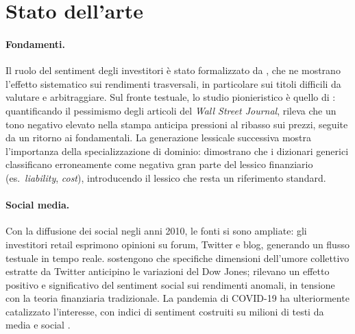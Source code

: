 \documentclass[a4paper,11pt]{article}
\begin{document}
\section{Stato dell'arte}
\label{sec:sota}

\paragraph{Fondamenti.} Il ruolo del sentiment degli investitori è stato formalizzato da \textcite{baker2007investor}, che ne mostrano l'effetto sistematico sui rendimenti trasversali, in particolare sui titoli difficili da valutare e arbitraggiare. Sul fronte testuale, lo studio pionieristico è quello di \textcite{tetlock2007giving}: quantificando il pessimismo degli articoli del \textit{Wall Street Journal}, rileva che un tono negativo elevato nella stampa anticipa pressioni al ribasso sui prezzi, seguite da un ritorno ai fondamentali. La generazione lessicale successiva mostra l'importanza della specializzazione di dominio: \textcite{loughran2011liability} dimostrano che i dizionari generici classificano erroneamente come negativa gran parte del lessico finanziario (es.\ \textit{liability}, \textit{cost}), introducendo il lessico che resta un riferimento standard.

\paragraph{Social media.} Con la diffusione dei social negli anni 2010, le fonti si sono ampliate: gli investitori retail esprimono opinioni su forum, Twitter e blog, generando un flusso testuale in tempo reale. \textcite{bollen2011twitter} sostengono che specifiche dimensioni dell'umore collettivo estratte da Twitter anticipino le variazioni del Dow Jones; \textcite{mcgurk2020stock} rilevano un effetto positivo e significativo del sentiment social sui rendimenti anomali, in tensione con la teoria finanziaria tradizionale. La pandemia di COVID-19 ha ulteriormente catalizzato l'interesse, con indici di sentiment costruiti su milioni di testi da media e social \parencite{duan2021covid}.
\end{document}
